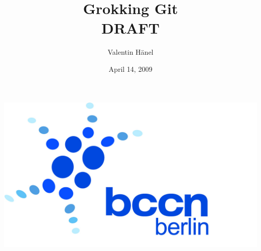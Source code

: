 \documentclass[hyperref={colorlinks=true,filecolor=blue}]{beamer}
\author{Valentin H\"anel}
\institute{Bernstein Center for Computational Neuroscience Berlin}
\title{Grokking Git \\DRAFT}
\date{April 14, 2009}
\begin{document}

\begin{frame}
	\includegraphics[scale=0.05]{BCCN_logo_berlin.jpg}
	\titlepage
\end{frame}


\end{document}
